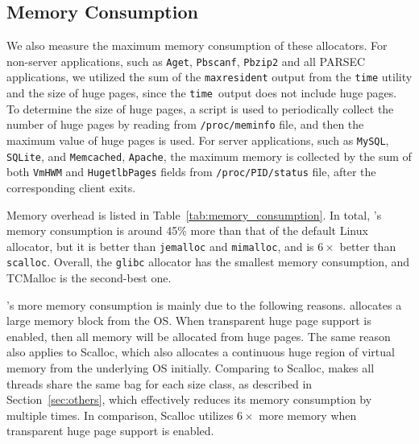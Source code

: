 \subsection{Memory Consumption}
\label{sec:memory}

We also measure the maximum memory consumption of these allocators. For non-server applications, such as \texttt{Aget}, \texttt{Pbscanf}, \texttt{Pbzip2} and all PARSEC applications, we utilized the sum of the \texttt{maxresident} output from the \texttt{time} utility and the size of huge pages, since the \texttt{time }output does not include huge pages. 
To determine the size of huge pages, a script is used to periodically collect the number of huge pages by reading from \texttt{/proc/meminfo} file, and then the maximum value of huge pages is used. 
For server applications, such as \texttt{MySQL}, \texttt{SQLite}, and \texttt{Memcached}, \texttt{Apache}, the maximum memory is collected by the sum of both \texttt{VmHWM} and \texttt{HugetlbPages} fields from \texttt{/proc/PID/status} file, after the corresponding client exits. 


% 

Memory overhead is listed in Table~\ref{tab:memory_consumption}. In total, \NM{}'s memory consumption is around 45\% more than that of the default Linux allocator, but it is better than \texttt{jemalloc} and  \texttt{mimalloc}, and is $6\times$ better than \texttt{scalloc}.  Overall, the \texttt{glibc} allocator has the smallest memory consumption, and TCMalloc is the second-best one. 
 
\NM{}'s more memory consumption is mainly due to the following reasons. \NM{} allocates a large memory block from the OS. When transparent huge page support is enabled, then all memory will be allocated from huge pages. The same reason also applies to Scalloc, which also allocates a continuous huge region of virtual memory from the underlying OS initially. Comparing to Scalloc, \NM{} makes all threads share the same bag for each size class, as described in Section~\ref{sec:others}, which effectively reduces its memory consumption by multiple times. In comparison, Scalloc utilizes $6\times$ more memory when transparent huge page support is enabled.  

